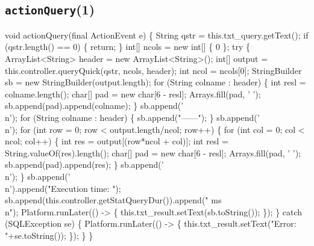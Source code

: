 \subsection{\texttt{actionQuery}(1)}
\nwenddocs{}\endmoddef{}
void actionQuery(final ActionEvent e) \{
  String qstr = this.txt_query.getText();
  if (qstr.length() == 0) \{
    return;
  \}
  int[] ncols = new int[] \{ 0 \};
  try \{
    ArrayList<String> header = new ArrayList<String>();
    int[] output = this.controller.queryQuick(qstr, ncols, header);
    int ncol = ncols[0];
    StringBuilder sb = new StringBuilder(output.length);
    for (String colname : header) \{
      int resl = colname.length();
      char[] pad = new char[6 - resl];
      Arrays.fill(pad, ' ');
      sb.append(pad).append(colname);
    \}
    sb.append('\\n');
    for (String colname : header) \{
      sb.append("------");
    \}
    sb.append('\\n');
    for (int row = 0; row < output.length/ncol; row++) \{
      for (int col = 0; col < ncol; col++) \{
        int res = output[(row*ncol + col)];
        int resl = String.valueOf(res).length();
        char[] pad = new char[6 - resl];
        Arrays.fill(pad, ' ');
        sb.append(pad).append(res);
      \}
      sb.append('\\n');
    \}
    sb.append('\\n').append("Execution time: ");
    sb.append(this.controller.getStatQueryDur()).append(" ms\\n");
    Platform.runLater(() -> \{
      this.txt_result.setText(sb.toString());
    \});
  \} catch (SQLException se) \{
    Platform.runLater(() -> \{
      this.txt_result.setText("Error: "+se.toString());
    \});
  \}
\}
\eatline
{}\nwendcode{}\nwdocspar
